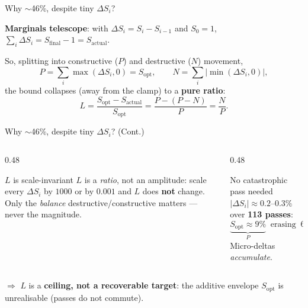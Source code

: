 \documentclass[
	aspectratio=169, %
]{beamer}
\begin{document}
\begin{frame}{Why $\sim$46\%, despite tiny $\Delta S_i$?}
\begin{center}
\textbf{Marginals telescope}: with $\Delta S_i = S_i - S_{i-1}$ and $S_0 = 1$, \(\sum_i \Delta S_i = S_\mathrm{final} - 1 = S_\mathrm{actual}\).

So, splitting into constructive ($P$) and destructive ($N$) movement,
\[
    P = \sum_i \max(\Delta S_i, 0) = S_\mathrm{opt},
    \qquad
    N = \sum_i |\min(\Delta S_i, 0)|,
\]
the bound collapses (away from the clamp) to a \textbf{pure ratio}:
\[
    L = \frac{S_\mathrm{opt} - S_\mathrm{actual}}{S_\mathrm{opt}}
      = \frac{P - (P - N)}{P}
      = \boxed{\dfrac{N}{P}}.
\]
\end{center}
\end{frame}

\begin{frame}{Why $\sim$46\%, despite tiny $\Delta S_i$? (Cont.)}
\begin{columns}[T]
\begin{column}{0.48\textwidth}
\begin{warnbox}{$L$ is scale-invariant}
$L$ is a \emph{ratio}, not an amplitude: scale every $\Delta S_i$ by $1000$
or by $0.001$ and $L$ does \textbf{not} change.
Only the \emph{balance} destructive/constructive matters --- never the magnitude.
\end{warnbox}
\end{column}
\begin{column}{0.48\textwidth}
\begin{tipbox}{No catastrophic pass needed}
$|\Delta S_i|\!\approx\!0.2$--$0.3\%$ over \textbf{113 passes}:
\[
    \underbrace{S_\mathrm{opt}\!\approx\!9\%}_{P}\;\;
    \text{erasing}\;\;\underbrace{6\%}_{N}
    \;\Rightarrow\; L\!\approx\!67\%.
\]
Micro-deltas \emph{accumulate}.
\end{tipbox}
\end{column}
\end{columns}

\medskip
\centering
\small
$\Rightarrow$ $L$ is a \textbf{ceiling, not a recoverable target}:
the additive envelope $S_\mathrm{opt}$ is unrealisable (passes do not commute).
\end{frame}
\end{document}
